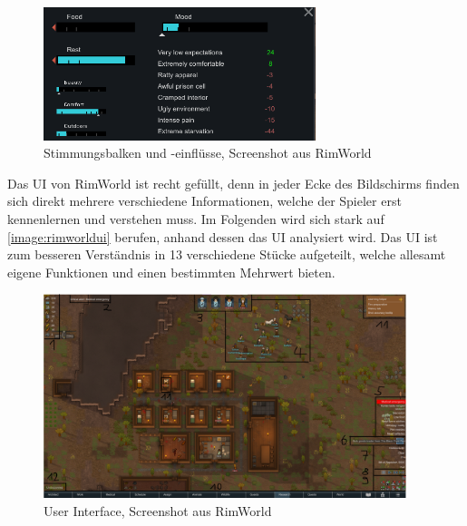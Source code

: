 \begin{figure}
    \begin{center}
        \includegraphics[width=300px]{0.bilder/rimworldmood.png}
    \end{center}
    \caption{Stimmungsbalken und -einflüsse, Screenshot aus RimWorld} \label{image:rimworldmood}
\end{figure}

Das UI von RimWorld ist recht gefüllt, denn in jeder Ecke des Bildschirms finden sich direkt mehrere verschiedene Informationen, welche der Spieler erst kennenlernen und verstehen muss. Im Folgenden wird sich stark auf \autoref{image:rimworldui} berufen, anhand dessen das UI analysiert wird. Das UI ist zum besseren Verständnis in 13 verschiedene Stücke aufgeteilt, welche allesamt eigene Funktionen und einen bestimmten Mehrwert bieten. 

\begin{figure}
    \begin{center}
        \includegraphics[width=400px]{0.bilder/rimworldui.png}
    \end{center}
    \caption{User Interface, Screenshot aus RimWorld} \label{image:rimworldui}
\end{figure}

